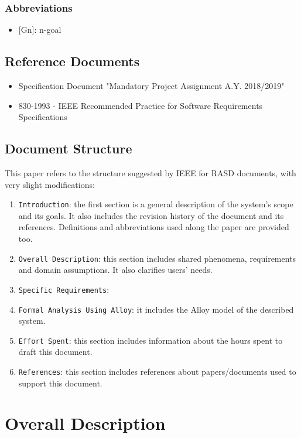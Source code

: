 \documentclass[12pt,a4paper]{article}
\begin{document}
			\subsubsection{Abbreviations}
				\begin{itemize}
				\item {[}Gn{]}: n-goal
				\end{itemize}
		
		\subsection{Reference Documents}
		   \begin{itemize}
           \item Specification Document "Mandatory Project Assignment A.Y. 2018/2019"
           \item 830-1993 - IEEE Recommended Practice for Software Requirements Specifications
				\end{itemize}
		\subsection{Document Structure}
			This paper refers to the structure suggested by IEEE for RASD documents, with very slight modifications:
			\begin{enumerate}
				\item \texttt{Introduction}: the first section is a general description of the system's scope and its goals. It also includes the revision history of the document and its references. Definitions and abbreviations used along the paper are provided too.
				\item \texttt{Overall Description}: this section includes shared phenomena, requirements and domain assumptions. It also clarifies users' needs.
				\item \texttt{Specific Requirements}: 
				\item \texttt{Formal Analysis Using Alloy}: it includes the Alloy model of the described system.
				\item \texttt{Effort Spent}: this section includes information about the hours spent to draft this document. 
				\item \texttt{References}: this section includes references about papers/documents used to support this document.
			\end{enumerate}
		

	\newpage
	\section{Overall Description}
	
\end{document}
